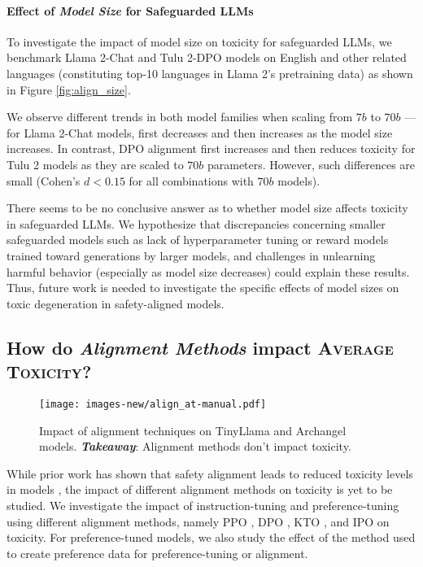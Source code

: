 \paragraph{Effect of \textit{Model Size} for Safeguarded LLMs}

To investigate the impact of model size on toxicity for safeguarded LLMs, we benchmark Llama 2-Chat and Tulu 2-DPO models on English and other related languages (constituting top-10 languages in Llama 2's pretraining data) as shown in Figure \ref{fig:align_size}.

We observe different trends in both model families when scaling from $7b$ to $70b$ --- for Llama 2-Chat models, \avgTox first decreases and then increases as the model size increases. In contrast, DPO alignment first increases and then reduces toxicity for Tulu 2 models as they are scaled to $70b$ parameters. However, such differences are small (Cohen's $d < 0.15$ for all combinations with $70b$ models).

There seems to be no conclusive answer as to whether model size affects toxicity in safeguarded LLMs. We hypothesize that discrepancies concerning smaller safeguarded models such as lack of hyperparameter tuning or reward models trained toward generations by larger models, and challenges in unlearning harmful behavior (especially as model size decreases) could explain these results. 
Thus, future work is needed to investigate the specific effects of model sizes on toxic degeneration in safety-aligned models. 

\subsection{\textbf{How do \textit{Alignment Methods} impact \textsc{Average Toxicity}?}}

\begin{wrapfigure}[13]{r}{4.5cm}
    \centering
    \vspace{-20pt}
    \texttt{[image: images-new/align\_at-manual.pdf]}
    \vspace{-20pt}
    \caption{Impact of alignment techniques on TinyLlama and Archangel models. \textbf{\textit{Takeaway}}: Alignment methods don't impact toxicity.}
    \label{fig:align-tech}
\end{wrapfigure}

While prior work has shown that safety alignment leads to reduced toxicity levels in models \citep{touvron2023llama2}, the impact of different alignment methods on toxicity is yet to be studied. 
We investigate the impact of instruction-tuning and preference-tuning using different alignment methods, namely PPO \citep{schulman2017proximal}, DPO \citep{rafailov2024direct}, KTO \citep{ethayarajh2024kto}, and IPO \citep{azar2023general} on toxicity. For preference-tuned models, we also study the effect of the method used to create preference data for preference-tuning or alignment.

